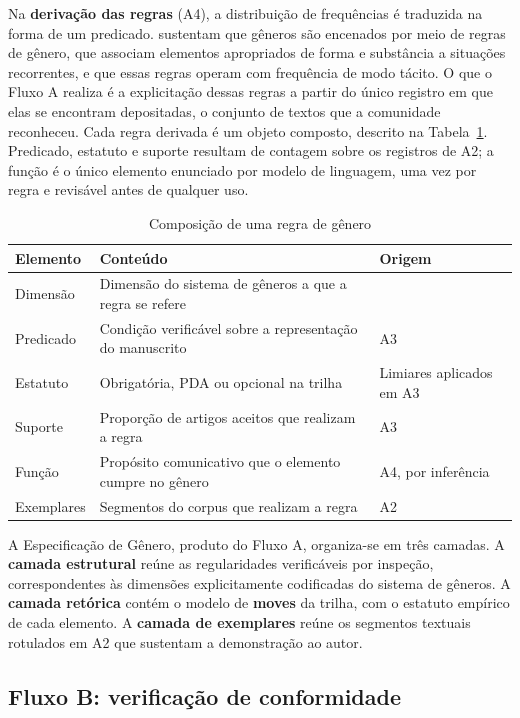 Na \textbf{derivação das regras} (A4), a distribuição de frequências é traduzida na forma de um predicado.  sustentam que gêneros são encenados por meio de regras de gênero, que associam elementos apropriados de forma e substância a situações recorrentes, e que essas regras operam com frequência de modo tácito. O que o Fluxo A realiza é a explicitação dessas regras a partir do único registro em que elas se encontram depositadas, o conjunto de textos que a comunidade reconheceu. Cada regra derivada é um objeto composto, descrito na Tabela~\ref{tab:regra}. Predicado, estatuto e suporte resultam de contagem sobre os registros de A2; a função é o único elemento enunciado por modelo de linguagem, uma vez por regra e revisável antes de qualquer uso.

\begin{table}[H]
\centering
\caption{Composição de uma regra de gênero}
\label{tab:regra}
\small
\begin{tabular}{|p{2.6cm}|p{7.2cm}|p{3.4cm}|}
\hline
\textbf{Elemento} & \textbf{Conteúdo} & \textbf{Origem} \\
\hline
Dimensão & Dimensão do sistema de gêneros a que a regra se refere & \cite{GenreSystems} \\
\hline
Predicado & Condição verificável sobre a representação do manuscrito & A3 \\
\hline
Estatuto & Obrigatória, PDA ou opcional na trilha & Limiares aplicados em A3 \\
\hline
Suporte & Proporção de artigos aceitos que realizam a regra & A3 \\
\hline
Função & Propósito comunicativo que o elemento cumpre no gênero & A4, por inferência \\
\hline
Exemplares & Segmentos do corpus que realizam a regra & A2 \\
\hline
\end{tabular}
\end{table}

A Especificação de Gênero, produto do Fluxo A, organiza-se em três camadas. A \textbf{camada estrutural} reúne as regularidades verificáveis por inspeção, correspondentes às dimensões explicitamente codificadas do sistema de gêneros. A \textbf{camada retórica} contém o modelo de \textbf{moves} da trilha, com o estatuto empírico de cada elemento. A \textbf{camada de exemplares} reúne os segmentos textuais rotulados em A2 que sustentam a demonstração ao autor.

\subsection{Fluxo B: verificação de conformidade}
\label{sec:fluxo-b}

